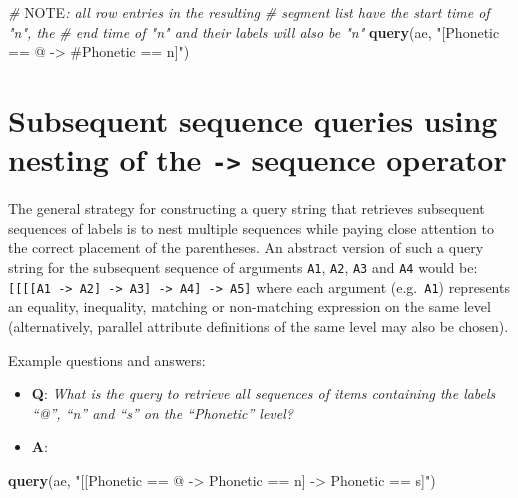 \documentclass[]{book}
\newenvironment{Shaded}{\begin{snugshade}}{\end{snugshade}}
\newcommand{\AlertTok}[1]{\textcolor[rgb]{0.94,0.16,0.16}{#1}}
\newcommand{\CommentTok}[1]{\textcolor[rgb]{0.56,0.35,0.01}{\textit{#1}}}
\newcommand{\KeywordTok}[1]{\textcolor[rgb]{0.13,0.29,0.53}{\textbf{#1}}}
\newcommand{\NormalTok}[1]{#1}
\newcommand{\StringTok}[1]{\textcolor[rgb]{0.31,0.60,0.02}{#1}}
\providecommand{\tightlist}{%
  \setlength{\itemsep}{0pt}\setlength{\parskip}{0pt}}
\begin{document}
\begin{Shaded}
\begin{Highlighting}[]
\CommentTok{# }\AlertTok{NOTE}\CommentTok{: all row entries in the resulting}
\CommentTok{# segment list have the start time of "n", the}
\CommentTok{# end time of "n" and their labels will also be "n"}
\KeywordTok{query}\NormalTok{(ae, }\StringTok{"[Phonetic == @ -> #Phonetic == n]"}\NormalTok{)}
\end{Highlighting}
\end{Shaded}

\hypertarget{subsequent-sequence-queries-using-nesting-of-the---sequence-operator}{%
\section{\texorpdfstring{Subsequent sequence queries using nesting of the \texttt{-\textgreater{}} sequence operator}{Subsequent sequence queries using nesting of the -\textgreater{} sequence operator}}\label{subsequent-sequence-queries-using-nesting-of-the---sequence-operator}}

The general strategy for constructing a query string that retrieves subsequent sequences of labels is to nest multiple sequences while paying close attention to the correct placement of the parentheses. An abstract version of such a query string for the subsequent sequence of arguments \texttt{A1}, \texttt{A2}, \texttt{A3} and \texttt{A4} would be: \texttt{{[}{[}{[}{[}A1\ -\textgreater{}\ A2{]}\ -\textgreater{}\ A3{]}\ -\textgreater{}\ A4{]}\ -\textgreater{}\ A5{]}} where each argument (e.g.~\texttt{A1}) represents an equality, inequality, matching or non-matching expression on the same level (alternatively, parallel attribute definitions of the same level may also be chosen).

Example questions and answers:

\begin{itemize}
\tightlist
\item
  \textbf{Q}: \emph{What is the query to retrieve all sequences of items containing the labels ``@'', ``n'' and ``s'' on the ``Phonetic'' level?}
\item
  \textbf{A}:
\end{itemize}

\begin{Shaded}
\begin{Highlighting}[]
\KeywordTok{query}\NormalTok{(ae, }\StringTok{"[[Phonetic == @ -> Phonetic == n] -> Phonetic == s]"}\NormalTok{)}
\end{Highlighting}
\end{Shaded}
\end{document}

